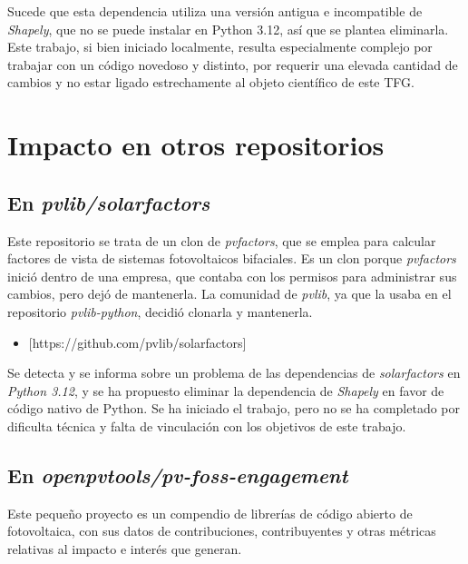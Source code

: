 Sucede que esta dependencia utiliza una versión antigua e incompatible de \textit{Shapely}, que no se puede instalar en Python 3.12, así que se plantea eliminarla. Este trabajo, si bien iniciado localmente, resulta especialmente complejo por trabajar con un código novedoso y distinto, por requerir una elevada cantidad de cambios y no estar ligado estrechamente al objeto científico de este TFG.


\section{Impacto en otros repositorios}

\subsection{En \textit{pvlib/solarfactors}}

Este repositorio se trata de un clon de \textit{pvfactors}, que se emplea para calcular factores de vista de sistemas fotovoltaicos bifaciales. Es un clon porque \textit{pvfactors} inició dentro de una empresa, que contaba con los permisos para administrar sus cambios, pero dejó de mantenerla. La comunidad de \textit{pvlib}, ya que la usaba en el repositorio \textit{pvlib-python}, decidió clonarla y mantenerla.

\begin{itemize}
    \item {}[https://github.com/pvlib/solarfactors]
\end{itemize}

Se detecta y se informa sobre un problema de las dependencias de \textit{solarfactors} en \textit{Python 3.12}, y se ha propuesto eliminar la dependencia de \textit{Shapely} en favor de código nativo de Python. Se ha iniciado el trabajo, pero no se ha completado por dificulta técnica y falta de vinculación con los objetivos de este trabajo.

\subsection{En \textit{openpvtools/pv-foss-engagement}}

Este pequeño proyecto es un compendio de librerías de código abierto de fotovoltaica, con sus datos de contribuciones, contribuyentes y otras métricas relativas al impacto e interés que generan.

